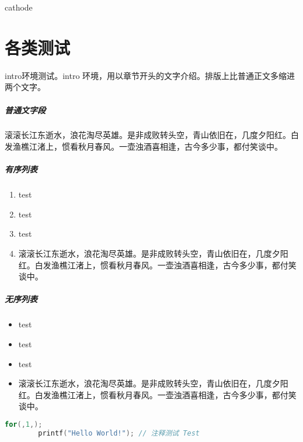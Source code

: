 \documentclass{../../PublicResources/DocClassLight}
\begin{document}
    cathode 

    \chapter{各类测试}

    \begin{intro}
        intro环境测试。intro 环境，用以章节开头的文字介绍。排版上比普通正文多缩进两个文字。
    \end{intro}

    \paragraph{普通文字段} 滚滚长江东逝水，浪花淘尽英雄。是非成败转头空，青山依旧在，几度夕阳红。白发渔樵江渚上，惯看秋月春风。一壶浊酒喜相逢，古今多少事，都付笑谈中。

    \paragraph{有序列表}
    \begin{enumerate}[label={Step \arabic*.}]
        \item test
        \item test
        \item test
        \item 滚滚长江东逝水，浪花淘尽英雄。是非成败转头空，青山依旧在，几度夕阳红。白发渔樵江渚上，惯看秋月春风。一壶浊酒喜相逢，古今多少事，都付笑谈中。
    \end{enumerate}

    \paragraph{无序列表}
    \begin{itemize}
        \item test
        \item test
        \item test
        \item 滚滚长江东逝水，浪花淘尽英雄。是非成败转头空，青山依旧在，几度夕阳红。白发渔樵江渚上，惯看秋月春风。一壶浊酒喜相逢，古今多少事，都付笑谈中。
    \end{itemize}

    \begin{lstlisting}[language={C},title={\textsf{C语言代码段测试}}]
        for(,1,);
        printf("Hello World!"); // 注释测试 Test
    \end{lstlisting}
\end{document}

